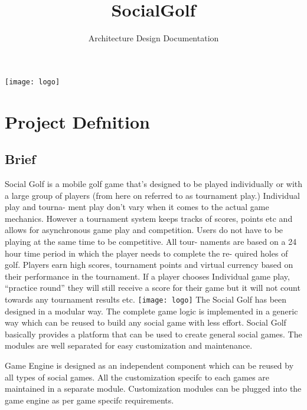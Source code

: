 \documentclass[12pt]{article}
\title{SocialGolf}
\author{Architecture Design Documentation}
\date{}
\begin{document}
\maketitle 
\begin{center} 
\texttt{[image: logo]}
\end{center}
\newpage
\tableofcontents
\newpage
\section{Project Defnition}
\subsection{Brief}
\indent Social Golf is a mobile golf game that’s designed to be played individually or with a large group of players (from here on referred to as tournament play.) Individual play and tourna- ment play don’t vary when it comes to the actual game mechanics. However a tournament system keeps tracks of scores, points etc and allows for asynchronous game play and competition. Users do not have to be playing at the same time to be competitive. All tour- naments are based on a 24 hour time period in which the player needs to complete the re- quired holes of golf. Players earn high scores, tournament points and virtual currency based on their performance in the tournament. If a player chooses Individual game play, “practice round” they will still receive a score for their game but it will not count towards any tournament results etc.
\texttt{[image: logo]}
\indent The Social Golf has been designed in a modular way. The complete game logic is implemented in a generic way which can be reused to build any social game with less effort. Social Golf basically provides a platform that can be used to create general social games. The modules are well separated for easy customization and maintenance.

\indent Game Engine is designed as an independent component which can be reused by all types of social games. All the customization specifc to each games are maintained in a separate module. Customization modules can be plugged into the game engine as per game specifc requirements.
\end{document}
